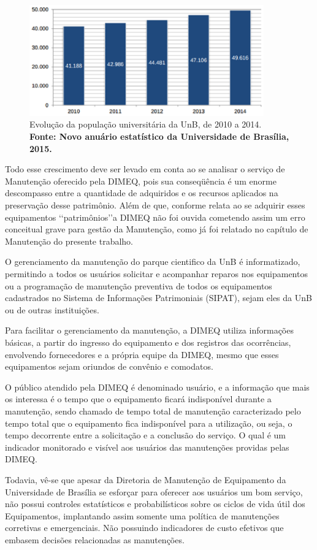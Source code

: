 \graphicspath{{figuras/}}
\begin{figure}[h]
\centering
\includegraphics[width=0.9\textwidth]{grafico_dimeq2.eps}
\caption{Evolução da população universitária da UnB, de 2010 a 2014. \textbf{Fonte: Novo anuário estatístico da Universidade de Brasília, 2015.}}
\label{grafico_dimeq2}
\end{figure}

Todo esse crescimento deve ser levado em conta ao se analisar o serviço de Manutenção oferecido pela DIMEQ, pois sua conseqüência é um enorme descompasso entre a quantidade de adquiridos e os recursos aplicados na preservação desse patrimônio. Além de que, conforme relata \cite{limacastilho2006} ao se adquirir esses equipamentos \lq\lq patrimônios\rq\rq a DIMEQ não foi ouvida cometendo assim um erro conceitual grave para gestão da Manutenção, como já foi relatado no capítulo de Manutenção do presente trabalho.
	
O gerenciamento da manutenção do parque cientifico da UnB é informatizado, permitindo a todos os usuários solicitar e acompanhar reparos nos equipamentos ou a programação de manutenção preventiva de todos os equipamentos cadastrados no Sistema de Informações Patrimoniais (SIPAT), sejam eles da UnB ou de outras instituições. 
	
Para facilitar o gerenciamento da manutenção, a DIMEQ utiliza informações básicas, a partir do ingresso do equipamento e dos registros das ocorrências, envolvendo fornecedores e a própria equipe da DIMEQ, mesmo que esses equipamentos sejam oriundos de convênio e comodatos.
	
O público atendido pela DIMEQ é denominado usuário, e a informação que mais os interessa é o tempo que o equipamento ficará indisponível durante a manutenção, sendo chamado de tempo total de manutenção caracterizado pelo tempo total que o equipamento fica indisponível para a utilização, ou seja, o tempo decorrente entre a solicitação e a conclusão do serviço. O qual é um indicador monitorado e visível aos usuários das manutenções providas pelas DIMEQ.

Todavia, vê-se que apesar da Diretoria de Manutenção de Equipamento da Universidade de Brasília se esforçar para oferecer aos usuários um bom serviço, não possui controles estatísticos e probabilísticos sobre os ciclos de vida útil dos Equipamentos, implantando assim somente uma política de manutenções corretivas e emergenciais. Não possuindo indicadores de custo efetivos que embasem decisões relacionadas as manutenções. 

